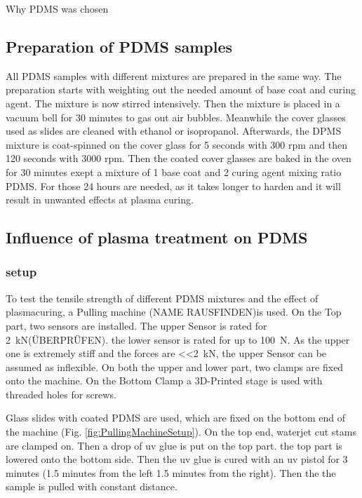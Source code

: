 Why PDMS was chosen

\subsection{Preparation of PDMS samples}

All PDMS samples with different mixtures are prepared in the same way. The preparation starts with weighting out the needed amount of base coat and curing agent. The mixture is now stirred intensively. Then the mixture is placed in a vacuum bell for 30 minutes to gas out air bubbles. Meanwhile the cover glasses used as slides are cleaned with ethanol or isopropanol. Afterwards, the DPMS mixture is coat-spinned on the cover glass for 5 seconds with 300 rpm and then 120 seconds with 3000 rpm. Then the coated cover glasses are baked in the oven for 30 minutes exept a mixture of 1 base coat and 2 curing agent mixing ratio PDMS. For those 24 hours are needed, as it takes longer to harden and it will result in unwanted effects at plasma curing.



\subsection{Influence of plasma treatment on PDMS}

\subsubsection{setup}

To test the tensile strength of different PDMS mixtures and the effect of plasmacuring, a Pulling machine (NAME RAUSFINDEN)is used. 
On the Top part, two sensors are installed. The upper Sensor is rated for \SI{2}{\kilo\newton}(ÜBERPRÜFEN). the lower sensor is rated for up to \SI{100}{\newton}. As the upper one is extremely stiff and the forces are \SI{<<2}{\kilo\newton}, the upper Sensor can be assumed as inflexible. On both the upper and lower part, two clamps are fixed onto the machine. On the Bottom Clamp a 3D-Printed stage is used with threaded holes for screws. 

Glass slides with coated PDMS are used, which are fixed on the bottom end of the machine (Fig. \ref{fig:PullingMachineSetup}). On the top end, waterjet cut stams are clamped on. Then a drop of uv glue is put on the top part. the top part is lowered onto the bottom side. Then the uv glue is cured with an uv pistol for 3 minutes (1.5 minutes from the left 1.5 minutes from the right). Then the the sample is pulled with constant distance.

